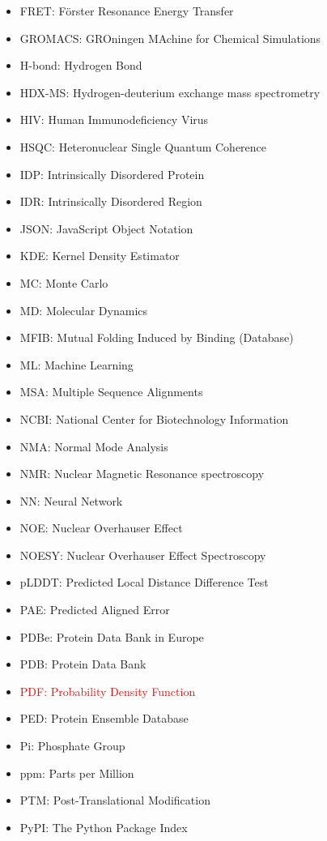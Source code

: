 \begin{itemize}
    \item FRET: Förster Resonance Energy Transfer
    \item GROMACS: GROningen MAchine for Chemical Simulations
    \item H-bond: Hydrogen Bond
    \item HDX-MS: Hydrogen-deuterium exchange mass spectrometry
    \item HIV: Human Immunodeficiency Virus
    \item HSQC: Heteronuclear Single Quantum Coherence
    \item IDP: Intrinsically Disordered Protein
    \item IDR: Intrinsically Disordered Region
    \item JSON: JavaScript Object Notation
    \item KDE: Kernel Density Estimator
    \item MC: Monte Carlo
    \item MD: Molecular Dynamics
    \item MFIB: Mutual Folding Induced by Binding (Database)
    \item ML: Machine Learning
    \item MSA: Multiple Sequence Alignments
    \item NCBI: National Center for Biotechnology Information
    \item NMA: Normal Mode Analysis
    \item NMR: Nuclear Magnetic Resonance spectroscopy
    \item NN: Neural Network
    \item NOE: Nuclear Overhauser Effect
    \item NOESY: Nuclear Overhauser Effect Spectroscopy
    \item pLDDT: Predicted Local Distance Difference Test
    \item PAE: Predicted Aligned Error
    \item PDBe: Protein Data Bank in Europe
    \item PDB: Protein Data Bank
    \item \textcolor{red}{PDF: Probability Density Function}
    \item PED: Protein Ensemble Database
    \item Pi: Phosphate Group
    \item ppm: Parts per Million
    \item PTM: Post-Translational Modification
    \item PyPI: The Python Package Index

\end{itemize}
